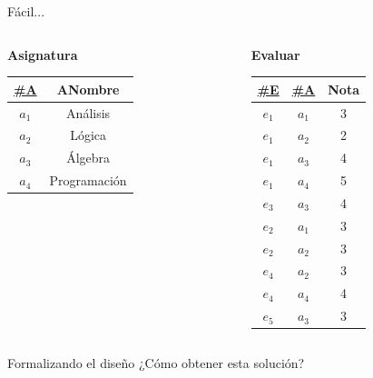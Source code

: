 \begin{frame}{F\'acil...}
\begin{columns}[T]
\begin{column}{0.68\linewidth}
\begin{columns}[T]
            \end{columns}

            \begin{center}
                \textbf{Asignatura}\\[2mm]

                \begin{tabular}{cc}
                    \underline{\#A} & ANombre\\[1mm]
                    \hline
                    $a_1$ & An\'alisis\\
                    $a_2$ & L\'ogica \\
                    $a_3$ & \'Algebra\\
                    $a_4$ & Programaci\'on
                    
                \end{tabular}
            \end{center}
            
        \end{column}

        \begin{column}{0.3\linewidth}
            \vspace{6mm}
            \begin{center}
                \textbf{Evaluar}\\[2mm]

                \begin{tabular}{ccc}
                    \underline{\#E} & \underline{\#A} & Nota\\[1mm]
                    \hline
                    $e_1$ & $a_1$ & 3\\
                    $e_1$ & $a_2$ & 2\\
                    $e_1$ & $a_3$ & 4\\
                    $e_1$ & $a_4$ & 5\\
                    $e_3$ & $a_3$ & 4\\
                    $e_2$ & $a_1$ & 3\\
                    $e_2$ & $a_2$ & 3\\
                    $e_4$ & $a_2$ & 3\\
                    $e_4$ & $a_4$ & 4\\
                    $e_5$ & $a_3$ & 3\\
                \end{tabular}
            \end{center}
        \end{column}
    \end{columns}
\end{frame}

    \begin{frame}{Formalizando el dise\~no}
        \centering
        \Large{ ¿C\'omo obtener esta soluci\'on?}
        
        \vfill
        
        \hfill
        \begin{minipage}{0.3\textwidth}
        \end{minipage}
    \end{frame}
